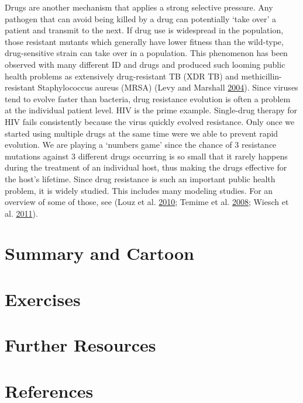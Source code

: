 \documentclass[
]{book}
\begin{document}
Drugs are another mechanism that applies a strong selective pressure. Any pathogen that can avoid being killed by a drug can potentially `take over' a patient and transmit to the next. If drug use is widespread in the population, those resistant mutants which generally have lower fitness than the wild-type, drug-sensitive strain can take over in a population. This phenomenon has been observed with many different ID and drugs and produced such looming public health problems as extensively drug-resistant TB (XDR TB) and methicillin-resistant Staphylococcus aureus (MRSA) (Levy and Marshall \protect\hyperlink{ref-levy04}{2004}).
Since viruses tend to evolve faster than bacteria, drug resistance evolution is often a problem at the individual patient level. HIV is the prime example. Single-drug therapy for HIV fails consistently because the virus quickly evolved resistance. Only once we started using multiple drugs at the same time were we able to prevent rapid evolution. We are playing a `numbers game' since the chance of 3 resistance mutations against 3 different drugs occurring is so small that it rarely happens during the treatment of an individual host, thus making the drugs effective for the host's lifetime.
Since drug resistance is such an important public health problem, it is widely studied. This includes many modeling studies. For an overview of some of those, see (Louz et al. \protect\hyperlink{ref-louz10}{2010}; Temime et al. \protect\hyperlink{ref-temime08}{2008}; Wiesch et al. \protect\hyperlink{ref-wiesch11}{2011}).

\hypertarget{summary-and-cartoon-14}{%
\section{Summary and Cartoon}\label{summary-and-cartoon-14}}

\hypertarget{exercises-14}{%
\section{Exercises}\label{exercises-14}}

\hypertarget{further-resources-14}{%
\section{Further Resources}\label{further-resources-14}}

\hypertarget{references-15}{%
\section{References}\label{references-15}}
\end{document}
